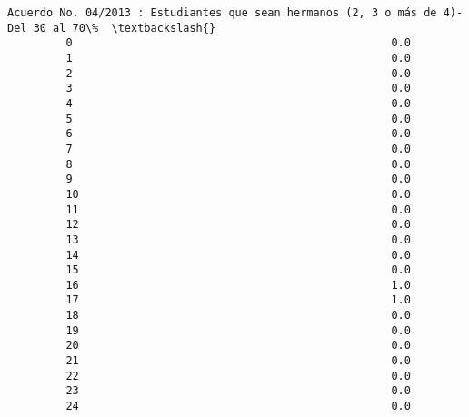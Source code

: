 \documentclass[11pt]{article}
\begin{document}
\begin{Verbatim}[commandchars=\\\{\}]
             Acuerdo No. 04/2013 : Estudiantes que sean hermanos (2, 3 o más de 4)-Del 30 al 70\%  \textbackslash{}
         0                                                 0.0                                     
         1                                                 0.0                                     
         2                                                 0.0                                     
         3                                                 0.0                                     
         4                                                 0.0                                     
         5                                                 0.0                                     
         6                                                 0.0                                     
         7                                                 0.0                                     
         8                                                 0.0                                     
         9                                                 0.0                                     
         10                                                0.0                                     
         11                                                0.0                                     
         12                                                0.0                                     
         13                                                0.0                                     
         14                                                0.0                                     
         15                                                0.0                                     
         16                                                1.0                                     
         17                                                1.0                                     
         18                                                0.0                                     
         19                                                0.0                                     
         20                                                0.0                                     
         21                                                0.0                                     
         22                                                0.0                                     
         23                                                0.0                                     
         24                                                0.0                                     

\end{Verbatim}
\end{document}
